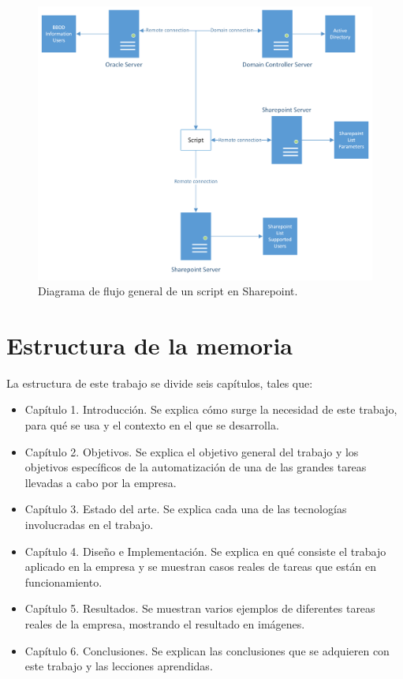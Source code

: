 \documentclass[a4paper, 12pt]{book}
\begin{document}
\begin{figure}
	\centering
	\includegraphics[width=17cm, keepaspectratio]{img/Sharepoint_diagrama.png}
	\caption{Diagrama de flujo general de un script en Sharepoint.}
	\label{fig:Sharepoint_diagrama}
\end{figure}

\section{Estructura de la memoria}
\label{sec:estructura}

La estructura de este trabajo se divide seis capítulos, tales que:

\begin{itemize}
\item Capítulo 1. Introducción.
Se explica cómo surge la necesidad de este trabajo, para qué se usa y el contexto en el que se desarrolla.

\item Capítulo 2. Objetivos.
Se explica el objetivo general del trabajo y los objetivos específicos de la automatización de una de las grandes tareas llevadas a cabo por la empresa.

\item Capítulo 3. Estado del arte.
Se explica cada una de las tecnologías involucradas en el trabajo.

\item Capítulo 4. Diseño e Implementación.
Se explica en qué consiste el trabajo aplicado en la empresa y se muestran casos reales de tareas que están en funcionamiento.

\item Capítulo 5. Resultados.
Se muestran varios ejemplos de diferentes tareas reales de la empresa, mostrando el resultado en imágenes.

\item Capítulo 6. Conclusiones.
Se explican las conclusiones que se adquieren con este trabajo y las lecciones aprendidas.

\end{itemize}
\end{document}
